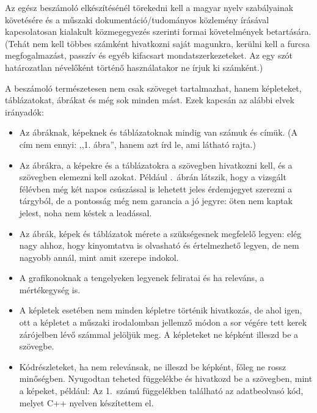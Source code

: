 \documentclass[a4paper,oneside]{article}
\begin{document}
Az egész beszámoló elkészítésénél törekedni kell a magyar nyelv
szabályainak követésére és a műszaki dokumentáció/tudományos közlemény
írásával kapcsolatosan kialakult közmegegyezés szerinti formai
követelmények betartására.  (Tehát nem kell többes számként hivatkozni
saját magunkra, kerülni kell a furcsa megfogalmazást, passzív és egyéb
kifacsart mondatszerkezeteket.  Az egy szót határozatlan névelőként
történő használatakor ne írjuk ki számként.)


A beszámoló természetesen nem csak szöveget tartalmazhat, hanem
képleteket, táblázatokat, ábrákat és még sok minden mást.  Ezek
kapcsán az alábbi elvek irányadók:
\begin{itemize}
\item Az ábráknak, képeknek és táblázatoknak mindig van számuk és
  címük. (A cím nem ennyi: ,,1. ábra'', hanem azt írd le, ami látható
  rajta.)

\item Az ábrákra, a képekre és a táblázatokra a szövegben hivatkozni
  kell, és a szövegben elemezni kell azokat. Például
  .~ábrán látszik, hogy a vizsgált félévben még két
  napos csúszással is lehetett jeles érdemjegyet szerezni a tárgyból,
  de a pontosság még nem garancia a jó jegyre: öten nem kaptak jelest,
  noha nem késtek a leadással.

\item Az ábrák, képek és táblázatok mérete a szükségesnek megfelelő
  legyen: elég nagy ahhoz, hogy kinyomtatva is olvasható és
  értelmezhető legyen, de nem nagyobb annál, mint amit szerepe
  indokol.

\item A grafikonoknak a tengelyeken legyenek feliratai és ha releváns,
  a mértékegység is.

\item A képletek esetében nem minden képletre történik hivatkozás, de
  ahol igen, ott a képletet a műszaki irodalomban jellemző módon a sor
  végére tett kerek zárójelben lévő számmal jelöljük meg.  A
  képleteket ne képként illeszd be a szövegbe.

\item Kódrészleteket, ha nem relevánsak, ne illeszd be képként, főleg
  ne rossz minőségben. Nyugodtan teheted függelékbe és hivatkozd be a
  szövegben, mint a képeket, például: Az 1.~számú függelékben
  található az adatbeolvasó kód, melyet C++ nyelven készítettem el.
\end{itemize}
\end{document}

